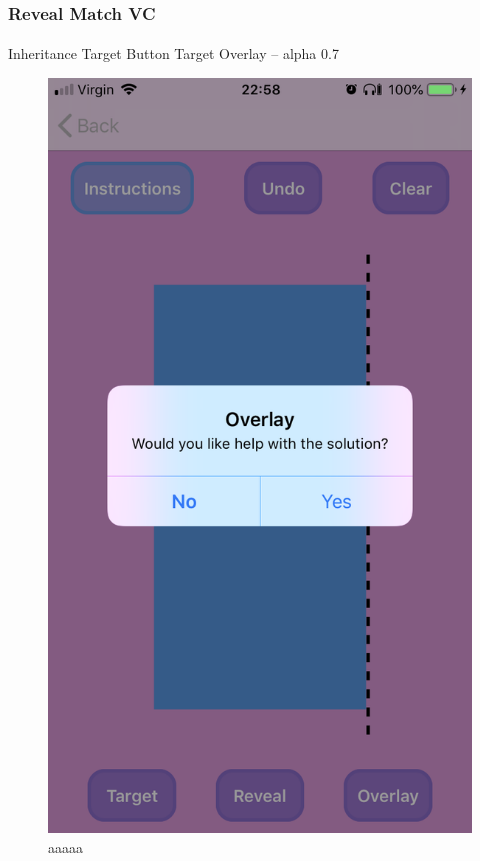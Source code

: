 \documentclass[11pt]{article}
\begin{document}
 \subsubsection{Reveal Match VC}
    
            \paragraph{}
Inheritance
Target Button
Target Overlay – alpha 0.7



            \begin{figure}[!ht]
                        \begin{minipage}{0.45\textwidth}
                            \centering \includegraphics[width=0.7\linewidth]{KiriZen/overlayPopUp.png}
                            \caption{aaaaa}
                            \label{fig:kiriZen-overlayPopUp}
                        \end{minipage}\hfill
                        \begin{minipage}{0.45\textwidth}

\end{minipage}
\end{figure}
\end{document}
